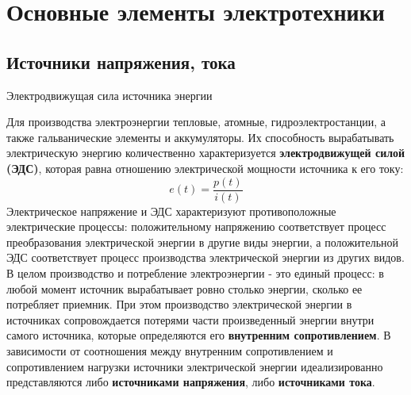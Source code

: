 \documentclass[12pt, pdf, hyperref={unicode},handout]{beamer}
\begin{document}
\section{Основные элементы электротехники}

\subsection{Источники напряжения, тока}
\begin{frame}{Электродвижущая сила источника энергии}
  \begin{block}

    \small{
      Для производства электроэнергии тепловые, атомные, гидроэлектростанции, а также гальванические элементы и аккумуляторы. Их способность вырабатывать электрическую энергию количественно характеризуется \textbf{электродвижущей силой (ЭДС)}, которая равна отношению электрической мощности источника к его току:
      $$e(t)=\frac{p(t)}{i(t)}$$
      Электрическое напряжение и ЭДС характеризуют противоположные электрические процессы: положительному напряжению соответствует процесс преобразования электрической энергии в другие виды энергии, а положительной ЭДС соответствует процесс производства электрической энергии из других видов.
      В целом производство и потребление электроэнергии  - это единый процесс: в любой момент источник вырабатывает ровно столько энергии, сколько ее потребляет приемник. При этом производство электрической энергии в источниках сопровождается потерями части произведенный энергии внутри самого источника, которые определяются его \textbf{внутренним сопротивлением}.
    В зависимости от соотношения между внутренним сопротивлением и сопротивлением нагрузки источники электрической энергии идеализированно представляются либо \textbf{источниками напряжения}, либо \textbf{источниками тока}.  
}

  \end{block}
  
\end{frame}
\end{document}
